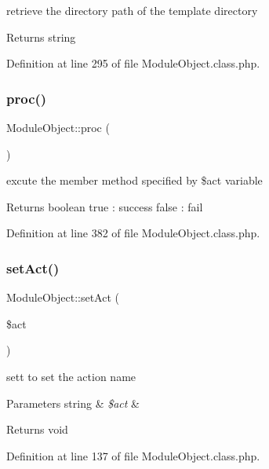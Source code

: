 retrieve the directory path of the template directory \begin{DoxyReturn}{Returns}
string 
\end{DoxyReturn}


Definition at line 295 of file Module\+Object.\+class.\+php.

\mbox{\label{classModuleObject_a621ea29505c6ccd4444a06bc1c8554a5}} 
\subsubsection{\texorpdfstring{proc()}{proc()}}
{\footnotesize\ttfamily Module\+Object\+::proc (\begin{DoxyParamCaption}{ }\end{DoxyParamCaption})}

excute the member method specified by \$act variable \begin{DoxyReturn}{Returns}
boolean true \+: success false \+: fail 
\end{DoxyReturn}


Definition at line 382 of file Module\+Object.\+class.\+php.

\mbox{\label{classModuleObject_a35d0b9120ea393d4b4177b0c667e198c}} 
\subsubsection{\texorpdfstring{set\+Act()}{setAct()}}
{\footnotesize\ttfamily Module\+Object\+::set\+Act (\begin{DoxyParamCaption}\item[{}]{\$act }\end{DoxyParamCaption})}

sett to set the action name 
\begin{DoxyParams}[1]{Parameters}
string & {\em \$act} & \\
\hline
\end{DoxyParams}
\begin{DoxyReturn}{Returns}
void 
\end{DoxyReturn}


Definition at line 137 of file Module\+Object.\+class.\+php.

